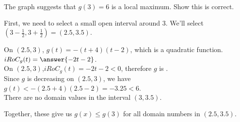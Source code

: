 \documentclass{ximera}
\begin{document}
\begin{exercise}
The graph suggests that $g(3) = 6$ is a local maximum.  Show this is correct. \\





\begin{explanation}



First, we need to select a small open interval around $3$.  We'll select $\left( 3 - \frac{1}{2}, 3 + \frac{1}{2} \right) = (2.5, 3.5)$.


On $(2.5, 3)$,  $g(t) = -(t+4)(t-2)$, which is a quadratic function.  $iRoC_g(t) = \answer{-2t - 2}$. \\

On $(2.5, 3)$,$iRoC_g(t) = -2t - 2 < 0$, therefore $g$ is  . \\

Since $g$ is decreasing on $(2.5, 3)$, we have $g(t) < -(2.5 + 4)(2.5 - 2) = -3.25 < 6$. \\



There are no domain values in the interval $(3, 3.5)$.


Together, these give us $g(x) \leq g(3)$ for all domain numbers in $(2.5, 3.5)$.

\end{explanation}










\end{exercise}
\end{document}
